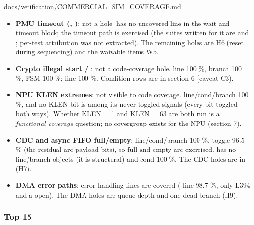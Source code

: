 \begin{relocated}{docs/verification/COMMERCIAL_SIM_COVERAGE.md}
\begin{itemize}
\tightlist
\item
  \textbf{PMU timeout (, )}: not a
  hole.  has no uncovered line in the  wait
  and timeout block; the timeout path is exercised (the suites written
  for it are  and ;
  per-test attribution was not extracted). The remaining 
  holes are H6 (reset during sequencing) and the waivable items W5.
\item
  \textbf{Crypto illegal start / }: not a
  code-coverage hole.  line 100 \%, branch 100 \%,
  FSM 100 \%;  line 100 \%. Condition rows are in
  section 6 (caveat C3).
\item
  \textbf{NPU KLEN extremes}: not visible to code coverage.
   line/\allowbreak{}cond/\allowbreak{}branch 100 \%, and
  no KLEN bit is among its never-toggled signals (every bit toggled both
  ways). Whether KLEN = 1 and KLEN = 63 are both run is a
  \emph{functional coverage} question; no covergroup exists for the NPU
  (section 7).
\item
  \textbf{CDC and async FIFO full/\allowbreak{}empty}:
   line/\allowbreak{}cond/\allowbreak{}branch 100
  \%, toggle 96.5 \% (the residual are payload bits), so full and empty
  are exercised.  has no line/\allowbreak{}branch
  objects (it is structural) and cond 100 \%. The CDC holes are in
   (H7).
\item
  \textbf{DMA error paths}: error handling lines are covered
  ( line 98.7 \%, only L394 and a 
  open). The DMA holes are queue depth and one dead branch (H9).
\end{itemize}

\subsubsection{Top 15}\label{tm:flow:commercial-sim-coverage:31-top-15}

{\footnotesize\setlength{\tabcolsep}{3pt}

}
\end{relocated}
